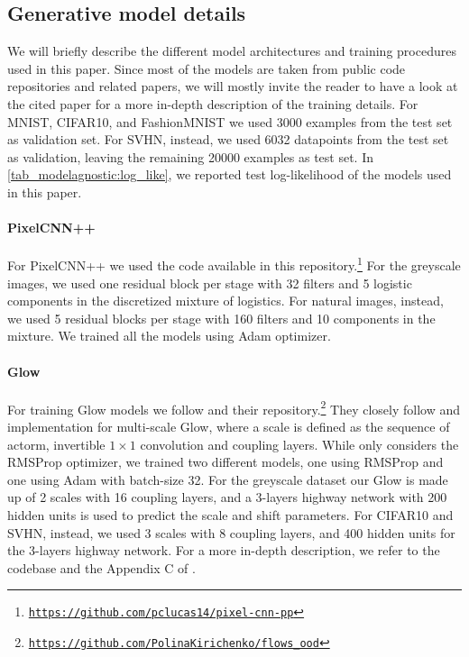 {\subsection{Generative model details}
We will briefly describe the different model architectures and training procedures used in this paper. Since most of the models are taken from public code repositories and related papers, we will mostly invite the reader to have a look at the cited paper for a more in-depth description of the training details.
For MNIST, CIFAR10, and FashionMNIST we used 3000 examples from the test set as validation set. For SVHN, instead, we used 6032 datapoints from the test set as validation, leaving the remaining 20000 examples as test set. In \cref{tab_modelagnostic:log_like}, we reported test log-likelihood of the models used in this paper. 

\paragraph{PixelCNN++} For PixelCNN++ we used the code available in this repository.\footnote{\href{https://github.com/pclucas14/pixel-cnn-pp}{\texttt{https://github.com/pclucas14/pixel-cnn-pp}}} For the greyscale images, we used one residual block per stage with 32 filters and 5 logistic components in the discretized mixture of logistics. For natural images, instead, we used 5 residual blocks per stage with 160 filters and 10 components in the mixture. We trained all the models using Adam optimizer.

\paragraph{Glow} For training Glow models we follow \textcite{kirichenko_why_2020} and their repository.\footnote{\href{https://github.com/PolinaKirichenko/flows_ood}{\texttt{https://github.com/PolinaKirichenko/flows\_ood}}} They closely follow \textcite{nalisnick_deep_2019} and \parencite{kingma_glow_2018} implementation for multi-scale Glow, where a scale is defined as the sequence of actorm, invertible $1\times1$ convolution and coupling layers. While \textcite{kirichenko_why_2020} only considers the RMSProp optimizer, we trained two different models, one using RMSProp and one using Adam with batch-size 32. For the greyscale dataset our Glow is made up of 2 scales with 16 coupling layers, and a 3-layers highway network with 200 hidden units is used to predict the scale and shift parameters. For CIFAR10 and SVHN, instead, we used 3 scales with 8 coupling layers, and 400 hidden units for the 3-layers highway network. %
For a more in-depth description, we refer to the codebase and the Appendix C of \textcite{kirichenko_why_2020}.

}
